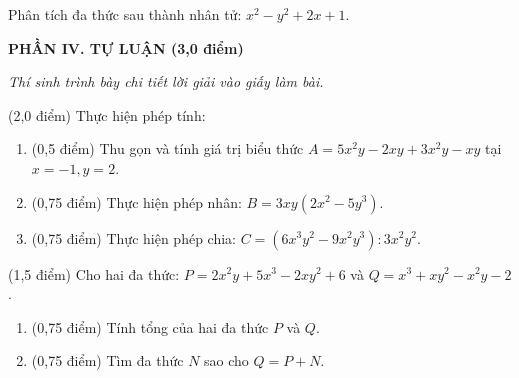 \documentclass[12pt,a4paper]{article}
\begin{document}
\begin{ex}
Phân tích đa thức sau thành nhân tử: $x^2 - y^2 + 2x + 1$. 
\end{ex}


\setcounter{ex}{0}
\noindent\textbf{\large PHẦN IV. TỰ LUẬN (3,0 điểm)}

\textit{Thí sinh trình bày chi tiết lời giải vào giấy làm bài.}

\vspace{1mm}
\begin{ex} (2,0 điểm)
Thực hiện phép tính:
\begin{enumerate}[label=\textbf{\alph*)}, leftmargin=0.8cm, itemsep=2pt]
\item (0,5 điểm) Thu gọn và tính giá trị biểu thức $A = 5x^2y - 2xy + 3x^2y - xy$ tại $x = -1, y = 2$.
\item (0,75 điểm) Thực hiện phép nhân: $B = 3xy(2x^2 - 5y^3)$.
\item (0,75 điểm) Thực hiện phép chia: $C = (6x^3y^2 - 9x^2y^3) : 3x^2y^2$.
\end{enumerate}
\end{ex}
\vspace{0.5mm}

\begin{ex} (1,5 điểm)
Cho hai đa thức: $P = 2x^2y + 5x^3 - 2xy^2 + 6$ và $Q = x^3 + xy^2 - x^2y - 2$.
\begin{enumerate}[label=\textbf{\alph*)}, leftmargin=0.8cm, itemsep=2pt]
\item (0,75 điểm) Tính tổng của hai đa thức $P$ và $Q$.
\item (0,75 điểm) Tìm đa thức $N$ sao cho $Q = P + N$.
\end{enumerate}
\end{ex}
\vspace{0.5mm}
\end{document}
